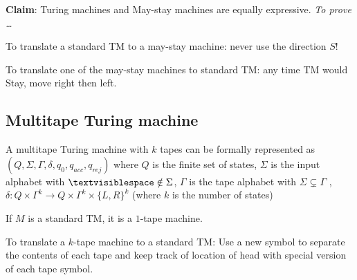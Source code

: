 \documentclass{article}
\begin{document}
{\bf Claim}: Turing machines and May-stay machines are equally expressive. {\it To prove \ldots}

To translate a standard TM to a may-stay machine: never use the direction $S$!


To translate one  of the  may-stay machines to standard TM:
any time TM would Stay, move right  then  left.

\subsection{Multitape Turing machine}
A multitape Turing machine with $k$ tapes can be formally represented as 
$(Q, \Sigma,  \Gamma, \delta, q_0, q_{acc}, q_{rej})$ 
where $Q$ is the finite set of  states,
$\Sigma$ is the  input alphabet with  $\textvisiblespace \notin \Sigma$,
$\Gamma$  is the  tape alphabet with $\Sigma \subsetneq \Gamma$ ,
$\delta: Q\times \Gamma^k\to Q \times \Gamma^k \times \{L,R\}^k$ 
(where $k$ is  the number of  states)


If $M$ is a standard  TM, it is a $1$-tape machine.


To translate a $k$-tape machine  to  a standard TM:
Use a  new symbol to separate the contents of each tape
and keep track of location of  head with  special version of each
tape symbol. 
\end{document}
